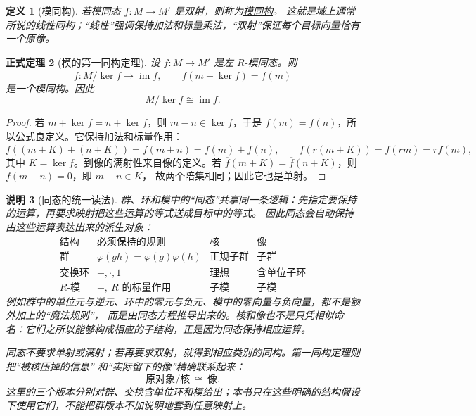 \documentclass[UTF8,fontset=none,a4paper,11pt]{ctexart}
\theoremstyle{foundation-definition}
\newtheorem{definition}{定义}[section]
\theoremstyle{foundation-theorem}
\newtheorem{theorem}[definition]{正式定理}
\theoremstyle{foundation-proposition}
\theoremstyle{foundation-example}
\theoremstyle{foundation-remark}
\newtheorem{remark}[definition]{说明}
\theoremstyle{foundation-theorem}
\newcommand{\term}[2]{\hyperref[#1]{#2}}
\begin{document}
\begin{definition}[模同构]\label{def:module-isomorphism}
若模同态 \(f:M\to M'\) 是双射，则称为\term{def:module-isomorphism}{模同构}。
这就是域上通常所说的线性同构；“线性”强调保持加法和标量乘法，“双射”保证每个目标向量恰有一个原像。
\end{definition}

\begin{theorem}[模的第一同构定理]\label{thm:module-first-isomorphism}
设 \(f:M\to M'\) 是左 \(R\)-模同态。则
\[
\overline f:M/\ker f\longrightarrow\operatorname{im}f,\qquad
\overline f(m+\ker f)=f(m)
\]
是一个模同构。因此
\[
M/\ker f\cong\operatorname{im}f.
\]
\end{theorem}

\begin{proof}
若 \(m+\ker f=n+\ker f\)，则 \(m-n\in\ker f\)，于是
\(f(m)=f(n)\)，所以公式良定义。它保持加法和标量作用：
\[
\overline f((m+K)+(n+K))=f(m+n)=f(m)+f(n),
\qquad
\overline f(r(m+K))=f(rm)=rf(m),
\]
其中 \(K=\ker f\)。到像的满射性来自像的定义。若
\(\overline f(m+K)=\overline f(n+K)\)，则 \(f(m-n)=0\)，即 \(m-n\in K\)，
故两个陪集相同；因此它也是单射。
\end{proof}

\begin{remark}[同态的统一读法]\label{rem:homomorphism-structure-bridge}
群、环和模中的“同态”共享同一条逻辑：先指定要保持的运算，再要求映射把这些运算的等式送成目标中的等式。
因此同态会自动保持由这些运算表达出来的派生对象：
\[
\begin{array}{c|c|c|c}
\text{结构}&\text{必须保持的规则}&\text{核}&\text{像}\\
\hline
\text{群}&\varphi(gh)=\varphi(g)\varphi(h)&
\text{正规子群}&\text{子群}\\
\text{交换环}&+,\cdot,1&
\text{理想}&\text{含单位子环}\\
R\text{-模}&+,\ R\text{ 的标量作用}&
\text{子模}&\text{子模}
\end{array}
\]
例如群中的单位元与逆元、环中的零元与负元、模中的零向量与负向量，都不是额外加上的“魔法规则”，
而是由同态方程推导出来的。核和像也不是只凭相似命名：它们之所以能够构成相应的子结构，正是因为同态保持相应运算。

同态不要求单射或满射；若再要求双射，就得到相应类别的同构。第一同构定理则把“被核压掉的信息”
和“实际留下的像”精确联系起来：
\[
\text{原对象}/\text{核}\ \cong\ \text{像}.
\]
这里的三个版本分别对群、交换含单位环和模给出；本书只在这些明确的结构假设下使用它们，不能把群版本不加说明地套到任意映射上。
\end{remark}
\end{document}
